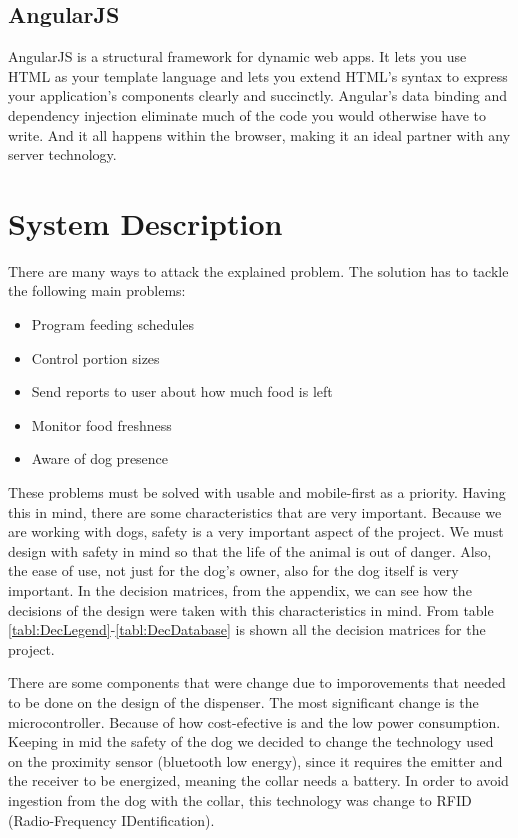 \documentclass[12pt]{article}
\begin{document}
\subsection{AngularJS}

AngularJS is a structural framework for dynamic web apps. It lets you use HTML as your template language and lets you extend HTML's syntax to express your application's components clearly and succinctly\cite{AngularJS2016}. Angular's data binding and dependency injection eliminate much of the code you would otherwise have to write. And it all happens within the browser, making it an ideal partner with any server technology.


\section{System Description}

There are many ways to attack the explained problem. The solution has to tackle the following main problems:

\begin{itemize}
  \item Program feeding schedules
  \item Control portion sizes
  \item Send reports to user about how much food is left
  \item Monitor food freshness
  \item Aware of dog presence
\end{itemize}

These problems must be solved with usable and mobile-first as a priority. Having this in mind, there are some characteristics that are very important. Because we are working with dogs, safety is a very important aspect of the project. We must design with safety in mind so that the life of the animal is out of danger. Also, the ease of use, not just for the dog's owner, also for the dog itself is very important. In the decision matrices, from the appendix, we can see how the decisions of the design were taken with this characteristics in mind. From table \ref{tabl:DecLegend}-\ref{tabl:DecDatabase} is shown all the decision matrices for the project.

There are some components that were change due to imporovements that needed to be done on the design of the dispenser. The most significant change is the microcontroller. Because of how cost-efective is and the low power consumption. Keeping in mid the safety of the dog we decided to change the technology used on the proximity sensor (bluetooth low energy), since it requires the emitter and the receiver to be energized, meaning the collar needs a battery. In order to avoid ingestion from the dog with the collar, this technology was change to RFID (Radio-Frequency IDentification).
\end{document}
